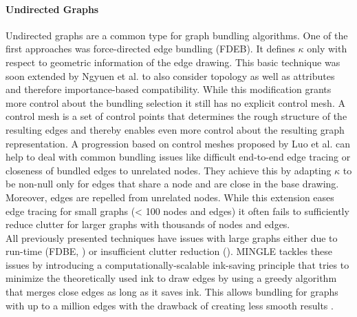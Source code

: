 \paragraph*{Undirected Graphs} Undirected graphs are a common type for graph bundling algorithms. One of the first approaches was force-directed edge bundling (FDEB). It defines $\kappa$ only with respect to geometric information of the edge drawing. This basic technique was soon extended by Ngyuen et al. \cite{Nguyen2011} to also consider topology as well as attributes and therefore importance-based compatibility. While this modification grants more control about the bundling selection it still has no explicit control mesh. A control mesh is a set of control points that determines the rough structure of the resulting edges and thereby enables even more control about the resulting graph representation. A progression based on control meshes proposed by Luo et al. \cite{Luo2012} can help to deal with common bundling issues like difficult end-to-end edge tracing or closeness of bundled edges to unrelated nodes. They achieve this by adapting $\kappa$ to be non-null only for edges that share a node and are close in the base drawing. Moreover, edges are repelled from unrelated nodes. While this extension eases edge tracing for small graphs (< 100 nodes and edges) it often fails to sufficiently reduce clutter for larger graphs with thousands of nodes and edges.\\
All previously presented techniques have issues with large graphs either due to run-time (FDBE, \cite{Nguyen2011}) or insufficient clutter reduction (\cite{Luo2012}). MINGLE \cite{Gansner2011} tackles these issues by introducing a computationally-scalable ink-saving principle that tries to minimize the theoretically used ink to draw edges by using a greedy algorithm that merges close edges as long as it saves ink. This allows bundling for graphs with up to a million edges with the drawback of creating less smooth results \cite{Lhuillier2017}. 

